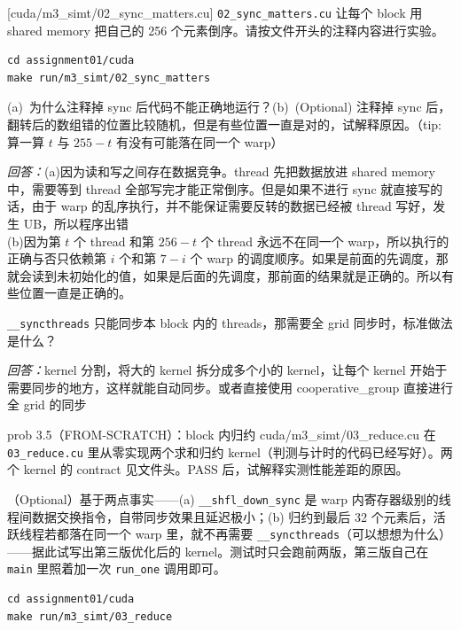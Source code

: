 \documentclass[11pt,a4paper,fontset=none]{ctexart}
\begin{document}
[cuda/m3\_simt/02\_sync\_matters.cu]
\texttt{02\_sync\_matters.cu} 让每个 block 用 shared memory 把自己的 256 个元素倒序。请按文件开头的注释内容进行实验。

\begin{lstlisting}
cd assignment01/cuda
make run/m3_simt/02_sync_matters
\end{lstlisting}

(a)~为什么注释掉 sync 后代码不能正确地运行？(b)~(Optional) 注释掉 sync 后，翻转后的数组错的位置比较随机，但是有些位置一直是对的，试解释原因。（tip: 算一算 $t$ 与 $255-t$ 有没有可能落在同一个 warp）
\par\noindent\textit{回答：}(a)因为读和写之间存在数据竞争。thread 先把数据放进 shared memory 中，需要等到 thread 全部写完才能正常倒序。但是如果不进行 sync 就直接写的话，由于 warp 的乱序执行，并不能保证需要反转的数据已经被 thread 写好，发生 UB，所以程序出错\\
(b)因为第 $t$ 个 thread 和第 $256 - t$ 个 thread 永远不在同一个 warp，所以执行的正确与否只依赖第 $i$ 个和第 $7 - i$  个 warp 的调度顺序。如果是前面的先调度，那就会读到未初始化的值，如果是后面的先调度，那前面的结果就是正确的。所以有些位置一直是正确的。


\texttt{\_\_syncthreads} 只能同步本 block 内的 threads，那需要全 grid 同步时，标准做法是什么？
\par\noindent\textit{回答：}kernel 分割，将大的 kernel 拆分成多个小的 kernel，让每个 kernel 开始于需要同步的地方，这样就能自动同步。或者直接使用 cooperative\_group 直接进行全 grid 的同步\\

\begin{capstone}{prob 3.5（FROM-SCRATCH）：block 内归约 \hfill {\footnotesize\ttfamily cuda/m3\_simt/03\_reduce.cu}}
在 \texttt{03\_reduce.cu} 里从零实现两个求和归约 kernel（判测与计时的代码已经写好）。两个 kernel 的 contract 见文件头。PASS 后，试解释实测性能差距的原因。

（Optional）基于两点事实——(a) \texttt{\_\_shfl\_down\_sync} 是 warp 内寄存器级别的线程间数据交换指令，自带同步效果且延迟极小；(b) 归约到最后 32 个元素后，活跃线程若都落在同一个 warp 里，就不再需要 \texttt{\_\_syncthreads}（可以想想为什么）——据此试写出第三版优化后的 kernel。测试时只会跑前两版，第三版自己在 \texttt{main} 里照着加一次 \texttt{run\_one} 调用即可。
\end{capstone}

\begin{lstlisting}
cd assignment01/cuda
make run/m3_simt/03_reduce
\end{lstlisting}
\end{document}
